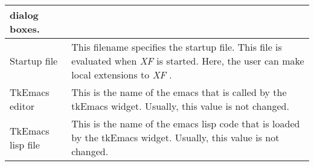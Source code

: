 {\begin{supertabular}{|l|p{7.8cm}|}
                    dialog boxes.\\  \hline
Startup file      & This filename specifies the
                    startup file. This file is evaluated
                    when {\em XF }
 is started. Here, the user can
                    make local extensions to {\em XF}
.\\  \hline
TkEmacs editor    & This is the name of the emacs that is
                    called by the tkEmacs widget. Usually,
                    this value is not changed.\\  \hline
TkEmacs lisp file & This is the name of the emacs lisp code
                    that is loaded by the tkEmacs widget.
                    Usually, this value is not changed.\\ 
\end{supertabular}
}

{\newpage
\clearpage
\samepage \begin{figure}[hbt]
  \centerline{
  \epsfysize=12.5cm
  }
  
  \label{fig:The procedure XFProcOptionsSource}
\end{figure}
}


